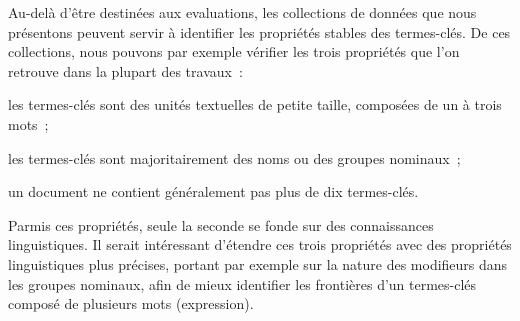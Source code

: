     Au-delà d'être destinées aux evaluations, les collections de données que
    nous présentons peuvent servir à identifier les propriétés stables des
    termes-clés. De ces collections, nous pouvons par exemple vérifier les trois
    propriétés que l'on retrouve dans la plupart des travaux~:
    \begin{enumerate*}
      \item{les termes-clés sont des unités textuelles de petite taille,
            composées de un à trois mots~;}
      \item{les termes-clés sont majoritairement des noms ou des groupes
            nominaux~;}
      \item{un document ne contient généralement pas plus de dix termes-clés.}
    \end{enumerate*}
    Parmis ces propriétés, seule la seconde se fonde sur des connaissances
    linguistiques. Il serait intéressant d'étendre ces trois propriétés avec
    des propriétés linguistiques plus précises, portant par exemple sur la
    nature des modifieurs dans les groupes nominaux, afin de mieux identifier
    les frontières d'un termes-clés composé de plusieurs mots (expression).

